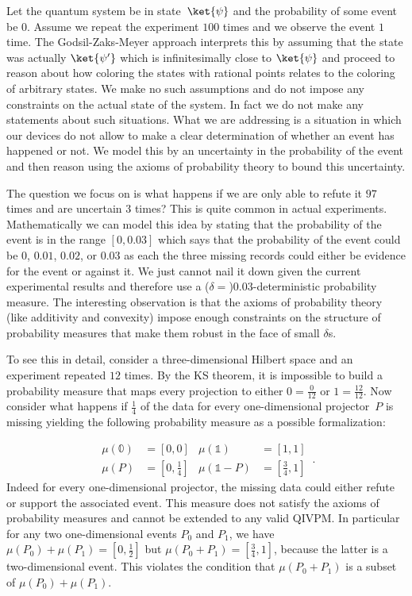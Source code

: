 \documentclass[english,reprint, aps, prl,superscriptaddress, showpacs,
showkeys, longbibliography, amsmath, amssymb, floatfix]{revtex4-1}
\theoremstyle{plain}
\theoremstyle{definition}
\newcommand{\imposs}{\ensuremath{\left[0,0\right]}}
\newcommand{\necess}{\ensuremath{\left[1,1\right]}}
\begin{document}
Let the quantum system be in state~$\ket{\psi}$ and the probability
of some event be $0$. Assume we repeat the experiment $100$ times
and we observe the event $1$ time. The Godsil-Zaks-Meyer approach
interprets this by assuming that the state was actually $\ket{\psi'}$
which is infinitesimally close to $\ket{\psi}$ and proceed to reason
about how coloring the states with rational points relates to the
coloring of arbitrary states. We make no such assumptions and do not
impose any constraints on the actual state of the system. In fact
we do not make any statements about such situations. What we are addressing
is a situation in which our devices do not allow to make a clear determination
of whether an event has happened or not. We model this by an uncertainty
in the probability of the event and then reason using the axioms of
probability theory to bound this uncertainty.

The question we focus on is what happens if we are only able to refute
it $97$ times and are uncertain $3$ times? This is quite common
in actual experiments. Mathematically we can model this idea by stating
that the probability of the event is in the range $\left[0,0.03\right]$
which says that the probability of the event could be $0$, $0.01$,
$0.02$, or $0.03$ as each the three missing records could either
be evidence for the event or against it. We just cannot nail it down
given the current experimental results and therefore use a ($\delta=$)$0.03$-deterministic
probability measure. The interesting observation is that the axioms
of probability theory (like additivity and convexity) impose enough
constraints on the structure of probability measures that make them
robust in the face of small $\delta$s.

To see this in detail, consider a three-dimensional Hilbert space
and an experiment repeated $12$ times. By the KS theorem, it is impossible
to build a probability measure that maps every projection to either
$0=\frac{0}{12}$ or $1=\frac{12}{12}$. Now consider what happens
if $\frac{1}{4}$ of the data for every one-dimensional projector~$P$
is missing yielding the following probability measure as a possible
formalization:

\begin{equation}
\begin{aligned}\mu\left(\mathbb{0}\right) & =\imposs & \mu\left(\mathbb{1}\right) & =\necess\\
\mu\left(P\right) & =\left[0,\tfrac{1}{4}\right] & \mu\left(\mathbb{1}-P\right) & =\left[\tfrac{3}{4},1\right]
\end{aligned}
\,.
\end{equation}
Indeed for every one-dimensional projector, the missing data could
either refute or support the associated event. This measure does not
satisfy the axioms of probability measures and cannot be extended
to any valid QIVPM. In particular for any two one-dimensional events
$P_{0}$ and $P_{1}$, we have $\mu\left(P_{0}\right)+\mu\left(P_{1}\right)=\left[0,\tfrac{1}{2}\right]$
but $\mu\left(P_{0}+P_{1}\right)=\left[\tfrac{3}{4},1\right]$, because
the latter is a two-dimensional event. This violates the condition
that $\mu\left(P_{0}+P_{1}\right)$ is a subset of $\mu\left(P_{0}\right)+\mu\left(P_{1}\right)$.
\end{document}
